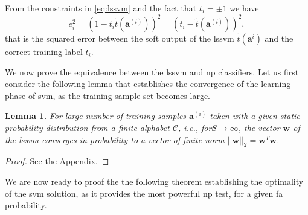 \documentclass[draftcls,onecolumn,12pt]{IEEEtran}
\newtheorem{lemma}{Lemma}
\begin{document}
From the constraints in \eqref{eq:lssvm} and the fact that $t_i = \pm 1$ we have
\begin{equation}
\label{eq:els}
e_i^2 = (1 - t_i\tilde{t}(\bm{a}^{(i)}) )^2 = (t_i - \tilde{t}(\bm{a}^{(i)}))^2,
\end{equation}
that is the squared error between the soft output of the \ac{lssvm} $\tilde{t}(\bm{a}^i)$ and the correct training label $t_i$.

We now prove the equivalence between the \ac{lssvm} and \ac{np} classifiers. Let us first consider the following lemma that establishes the convergence of the learning phase of \ac{svm}, as the training sample set becomes large.

\begin{lemma}
	\label{lem:lem1}
	For large number of training samples $\bm{a}^{(i)}$ taken with a given static probability distribution from a finite alphabet $\mathcal C$, i.e., for$S \rightarrow \infty$, the vector $\bm{w}$ of the \ac{lssvm} converges in probability to a vector of finite norm $||\bm{w}||_2 = \bm{w}^T\bm{w}$.
\end{lemma}

\begin{proof}
See the Appendix.
\end{proof}
 
We are now ready to proof the the following theorem establishing the optimality of the \ac{svm} solution, as it provides the most powerful \ac{np} test, for a given \ac{fa} probability.
\end{document}
